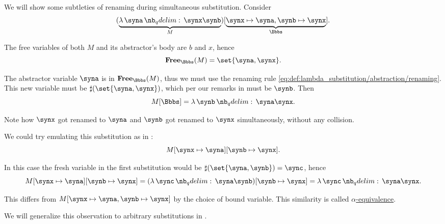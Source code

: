 \begin{example}
\begin{thmenum}
     We will show some subtleties of renaming during simultaneous substitution. Consider
    \begin{equation*}
      (\underbrace{\qabs \syna \synx \synb}_M)[\underbrace{\synx \mapsto \syna, \synb \mapsto \synx}_\Bbbs].
    \end{equation*}

    The free variables of both \( M \) and its abstractor's body are \( b \) and \( x \), hence
    \begin{equation*}
      \op*{Free}_\Bbbs(M) = \set{ \syna, \synx }.
    \end{equation*}

    The abstractor variable \( \syna \) is in \( \op*{Free}_\Bbbs(M) \), thus we must use the renaming rule \eqref{eq:def:lambda_substitution/abstraction/renaming}. This new variable must be \( \sharp(\set{ \syna, \synx }) \), which per our remarks in  must be \( \synb \). Then
    \begin{equation*}
      M[\Bbbs] = \qabs \synb \syna \synx.
    \end{equation*}

    Note how \( \synx \) got renamed to \( \syna \) and \( \synb \) got renamed to \( \synx \) simultaneously, without any collision.

    We could try emulating this substitution as in :
    \begin{equation*}
      M[\synx \mapsto \syna][\synb \mapsto \synx].
    \end{equation*}

    In this case the fresh variable in the first substitution would be \( \sharp(\set{ \syna, \synb }) = \sync \), hence
    \begin{equation*}
      M[\synx \mapsto \syna][\synb \mapsto \synx]
      =
      (\qabs \sync \syna \synb)[\synb \mapsto \synx]
      =
      \qabs \sync \syna \synx.
    \end{equation*}

    This differs from \( M[\synx \mapsto \syna, \synb \mapsto \synx] \) by the choice of bound variable. This similarity is called \hyperref[def:lambda_term_alpha_equivalence]{\( \alpha \)-equivalence}.

    We will generalize this observation to arbitrary substitutions in .
  \end{thmenum}
\end{example}

